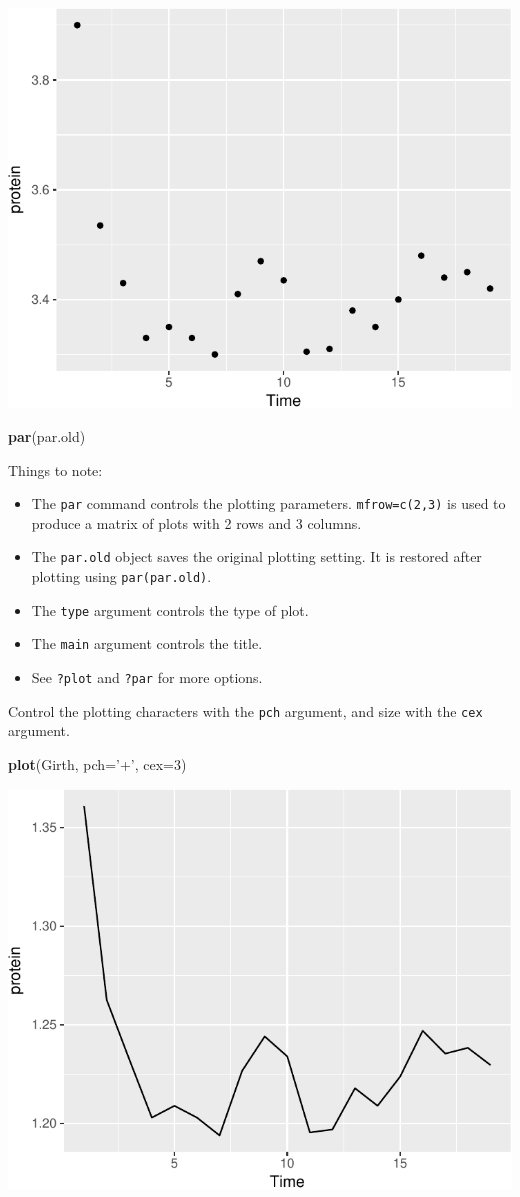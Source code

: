 \documentclass[]{book}
\newenvironment{Shaded}{\begin{snugshade}}{\end{snugshade}}
\newcommand{\KeywordTok}[1]{\textcolor[rgb]{0.13,0.29,0.53}{\textbf{#1}}}
\newcommand{\DataTypeTok}[1]{\textcolor[rgb]{0.13,0.29,0.53}{#1}}
\newcommand{\DecValTok}[1]{\textcolor[rgb]{0.00,0.00,0.81}{#1}}
\newcommand{\StringTok}[1]{\textcolor[rgb]{0.31,0.60,0.02}{#1}}
\newcommand{\NormalTok}[1]{#1}
\providecommand{\tightlist}{%
  \setlength{\itemsep}{0pt}\setlength{\parskip}{0pt}}
\theoremstyle{definition}
\theoremstyle{definition}
\theoremstyle{definition}
\theoremstyle{remark}
\begin{document}
\includegraphics[width=0.5\linewidth]{Rcourse_files/figure-latex/unnamed-chunk-243-1}

\begin{Shaded}
\begin{Highlighting}[]
\KeywordTok{par}\NormalTok{(par.old)}
\end{Highlighting}
\end{Shaded}

Things to note:

\begin{itemize}
\tightlist
\item
  The \texttt{par} command controls the plotting parameters.
  \texttt{mfrow=c(2,3)} is used to produce a matrix of plots with 2 rows
  and 3 columns.
\item
  The \texttt{par.old} object saves the original plotting setting. It is
  restored after plotting using \texttt{par(par.old)}.
\item
  The \texttt{type} argument controls the type of plot.
\item
  The \texttt{main} argument controls the title.
\item
  See \texttt{?plot} and \texttt{?par} for more options.
\end{itemize}

Control the plotting characters with the \texttt{pch} argument, and size
with the \texttt{cex} argument.

\begin{Shaded}
\begin{Highlighting}[]
\KeywordTok{plot}\NormalTok{(Girth, }\DataTypeTok{pch=}\StringTok{'+'}\NormalTok{, }\DataTypeTok{cex=}\DecValTok{3}\NormalTok{)}
\end{Highlighting}
\end{Shaded}

\includegraphics[width=0.5\linewidth]{Rcourse_files/figure-latex/unnamed-chunk-244-1}
\end{document}
